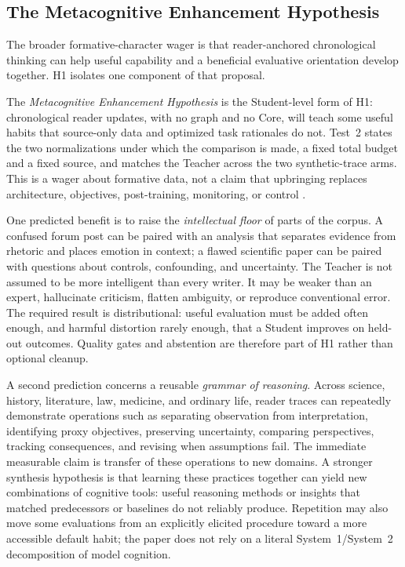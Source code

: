 \documentclass[11pt]{article}
\begin{document}
\subsection{The Metacognitive Enhancement Hypothesis}\label{sec:meh}

The broader formative-character wager is that reader-anchored chronological
thinking can help useful capability and a beneficial evaluative orientation
develop together. H1 isolates one component of that proposal.

The \emph{Metacognitive Enhancement Hypothesis} is the Student-level form of H1: chronological reader updates, with no graph and no Core, will teach some useful habits that source-only data and optimized task rationales do not. Test~2 states the two normalizations under which the comparison is made, a fixed total budget and a fixed source, and matches the Teacher across the two synthetic-trace arms. This is a wager about formative data, not a claim that upbringing replaces architecture, objectives, post-training, monitoring, or control \cite{nye2021scratchpads,zelikman2024quietstar}.

One predicted benefit is to raise the \emph{intellectual floor} of parts of the corpus. A confused forum post can be paired with an analysis that separates evidence from rhetoric and places emotion in context; a flawed scientific paper can be paired with questions about controls, confounding, and uncertainty. The Teacher is not assumed to be more intelligent than every writer. It may be weaker than an expert, hallucinate criticism, flatten ambiguity, or reproduce conventional error. The required result is distributional: useful evaluation must be added often enough, and harmful distortion rarely enough, that a Student improves on held-out outcomes. Quality gates and abstention are therefore part of H1 rather than optional cleanup.

A second prediction concerns a reusable \emph{grammar of reasoning}. Across science, history, literature, law, medicine, and ordinary life, reader traces can repeatedly demonstrate operations such as separating observation from interpretation, identifying proxy objectives, preserving uncertainty, comparing perspectives, tracking consequences, and revising when assumptions fail. The immediate measurable claim is transfer of these operations to new domains.
A stronger synthesis hypothesis is that learning these practices together can
yield new combinations of cognitive tools: useful reasoning methods or insights
that matched predecessors or baselines do not reliably produce. Repetition may also move some evaluations from an explicitly elicited procedure toward a more accessible default habit; the paper does not rely on a literal System~1/System~2 decomposition of model cognition.
\end{document}

